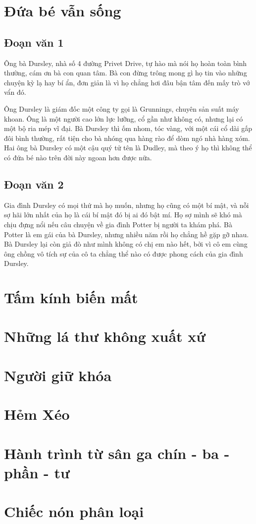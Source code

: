 \documentclass[a4paper, 12pt]{book}
\begin{document}
\tableofcontents
\setcounter{page}{0}
\chapter{Đứa bé vẫn sống}

\section{Đoạn văn 1}
Ông bà Dursley, nhà số 4 đường Privet Drive, tự hào mà nói họ hoàn toàn bình thường, cám ơn bà con quan tâm. Bà con đừng trông mong gì họ tin vào những chuyện kỳ lạ hay bí ẩn, đơn giản là vì \hfill họ chẳng hơi đâu bận tâm đến mấy trò vớ vẩn đó.

Ông Dursley là giám đốc một công ty gọi là Grunnings, chuyên sản suất máy khoan. Ông là một người cao lớn lực lưỡng, cổ gần như không có, nhưng lại có một bộ ria mép vĩ đại. Bà Dursley thì ốm nhom, tóc vàng, với một cái cổ dài gấp đôi bình thường, rất tiện cho bà nhóng qua hàng rào để dòm ngó nhà hàng xóm. Hai ông bà Dursley có một cậu quý tử tên là Dudley, mà theo ý họ thì không thể có đứa bé nào trên đời này ngoan hơn được nữa.
\pagecolor{blue!20!yellow!20!}
\color{red}

\section{Đoạn văn 2}
Gia đình Dursley có mọi thứ mà họ muốn, nhưng họ cũng có một bí mật, và nỗi sợ hãi lớn nhất của họ là cái bí mật đó bị ai đó bật mí. Họ sợ mình sẽ khó mà chịu đựng nổi nếu câu chuyện về gia đình Potter bị người ta khám phá. Bà Potter là em gái của bà Dursley, nhưng nhiều năm rồi họ chẳng hề gặp gỡ nhau. Bà Dursley lại còn giả đò như mình không có chị em nào hết, bởi vì cô em cùng ông chồng vô tích sự của cô ta chẳng thể nào có được phong cách của gia đình Dursley.
\chapter[Chương 2]{Tấm kính biến mất}
\pagecolor{blue!10!}
\chapter[Chương 3]{Những lá thư không xuất xứ}
\pagecolor{pink!20!}
\chapter[Chương 4]{Người giữ khóa}
\nopagecolor

\chapter{Hẻm Xéo}
\chapter{Hành trình từ sân ga chín - ba - phần - tư}
\chapter{Chiếc nón phân loại}
\end{document}
